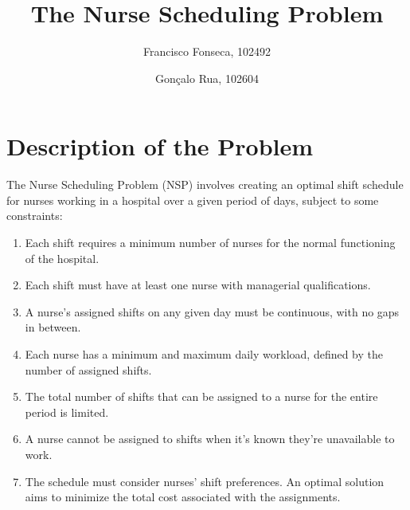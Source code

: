 \documentclass[sigconf, 10pt]{acmart}
\begin{document}
\title{The Nurse Scheduling Problem}

\author{Francisco Fonseca, 102492}
\author{Gonçalo Rua, 102604}
\authornotemark[1]

\renewcommand{\shortauthors}{Francisco Fonseca, Gonçalo Rua}

\maketitle

\section{Description of the Problem}
The Nurse Scheduling Problem (NSP) involves creating an optimal shift schedule for nurses working in a hospital over a given period of days, subject to some constraints:

\begin{enumerate}
    \item Each shift requires a minimum number of nurses for the normal functioning of the hospital.
    \item Each shift must have at least one nurse with managerial qualifications.
    \item A nurse's assigned shifts on any given day must be continuous, with no gaps in between.
    \item Each nurse has a minimum and maximum daily workload, defined by the number of assigned shifts.
    \item The total number of shifts that can be assigned to a nurse for the entire period is limited.
    \item A nurse cannot be assigned to shifts when it's known they're unavailable to work.
    \item The schedule must consider nurses' shift preferences. An optimal solution aims to minimize the total cost associated with the assignments.
\end{enumerate}
\end{document}
